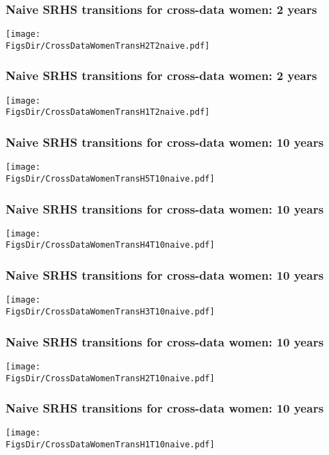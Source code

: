 \documentclass[aspectratio=169]{beamer}
\newcommand{\FigsDir}{../Figures}
\begin{document}
\begin{frame}\frametitle{Naive SRHS transitions for cross-data women: 2 years}
\begin{center}
\texttt{[image: \\FigsDir/CrossDataWomenTransH2T2naive.pdf]}
\end{center}
\end{frame}

\begin{frame}\frametitle{Naive SRHS transitions for cross-data women: 2 years}
\begin{center}
\texttt{[image: \\FigsDir/CrossDataWomenTransH1T2naive.pdf]}
\end{center}
\end{frame}

\begin{frame}\frametitle{Naive SRHS transitions for cross-data women: 10 years}
\begin{center}
	\texttt{[image: \\FigsDir/CrossDataWomenTransH5T10naive.pdf]}
\end{center}
\end{frame}

\begin{frame}\frametitle{Naive SRHS transitions for cross-data women: 10 years}
\begin{center}
\texttt{[image: \\FigsDir/CrossDataWomenTransH4T10naive.pdf]}
\end{center}
\end{frame}

\begin{frame}\frametitle{Naive SRHS transitions for cross-data women: 10 years}
\begin{center}
\texttt{[image: \\FigsDir/CrossDataWomenTransH3T10naive.pdf]}
\end{center}
\end{frame}

\begin{frame}\frametitle{Naive SRHS transitions for cross-data women: 10 years}
\begin{center}
\texttt{[image: \\FigsDir/CrossDataWomenTransH2T10naive.pdf]}
\end{center}
\end{frame}

\begin{frame}\frametitle{Naive SRHS transitions for cross-data women: 10 years}
\begin{center}
\texttt{[image: \\FigsDir/CrossDataWomenTransH1T10naive.pdf]}
\end{center}
\end{frame}
\end{document}
